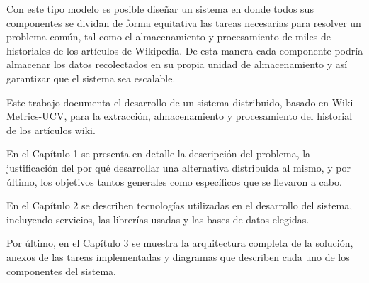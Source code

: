 Con este tipo modelo es posible diseñar un sistema en donde todos sus componentes se dividan
de forma equitativa las tareas necesarias para resolver un problema común, tal como el almacenamiento y
procesamiento de miles de historiales de los artículos de Wikipedia. De esta manera cada componente podría
almacenar los datos recolectados en su propia unidad de almacenamiento y así garantizar que el sistema
sea escalable.

Este trabajo documenta el desarrollo de un sistema distribuido, basado en Wiki-Metrics-UCV,
para la extracción, almacenamiento y procesamiento del historial de los artículos wiki.

En el Capítulo 1 se presenta en detalle la descripción del problema, la justificación del por qué
desarrollar una alternativa distribuida al mismo, y por último, los objetivos tantos generales como
específicos que se llevaron a cabo.

En el Capítulo 2 se describen tecnologías utilizadas en el desarrollo del sistema, incluyendo servicios,
las librerías usadas y las bases de datos elegidas.

Por último, en el Capítulo 3 se muestra la arquitectura completa de la solución, anexos de las tareas
implementadas y diagramas que describen cada uno de los componentes del sistema.